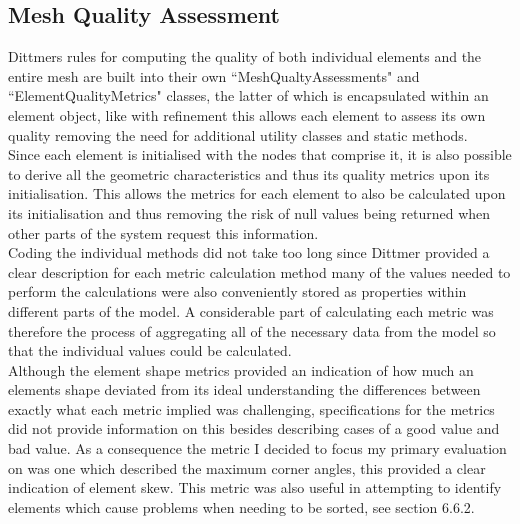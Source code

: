 \subsection{Mesh Quality Assessment}
Dittmers rules for computing the quality of both individual elements and the entire mesh are built into their own ``MeshQualtyAssessments" and ``ElementQualityMetrics" classes, the latter of which is encapsulated within an element object, like with refinement this allows each element to assess its own quality removing the need for additional utility classes and static methods. \\

\noindent
Since each element is initialised with the nodes that comprise it, it is also possible to derive all the geometric characteristics and thus its quality metrics upon its initialisation. This allows the metrics for each element to also be calculated upon its initialisation and thus removing the risk of null values being returned when other parts of the system request this information. \\ 

\noindent
Coding the individual methods did not take too long since Dittmer provided a clear description for each metric calculation method many of the values needed to perform the calculations were also conveniently stored as properties within different parts of the model. A considerable part of calculating each metric was therefore the process of aggregating all of the necessary data from the model so that the individual values could be calculated. \\ 

\noindent
Although the element shape metrics provided an indication of how much an elements shape deviated from its ideal understanding the differences between exactly what each metric implied was challenging, specifications for the metrics did not provide information on this besides describing cases of a good value and bad value. As a consequence the metric I decided to focus my primary evaluation on was one which described the maximum corner angles, this provided a clear indication of element skew. This metric was also useful in attempting to identify elements which cause problems when needing to be sorted, see section 6.6.2.




